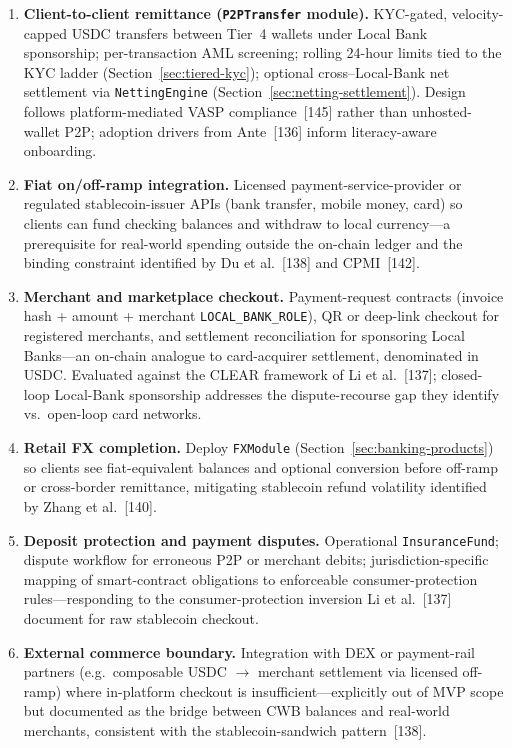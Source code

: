 \documentclass[12pt,a4paper]{report}
\begin{document}
\begin{enumerate}[noitemsep]
\item \textbf{Client-to-client remittance (\texttt{P2PTransfer} module).} KYC-gated, velocity-capped USDC transfers between Tier~4 wallets under Local Bank sponsorship; per-transaction AML screening; rolling 24-hour limits tied to the KYC ladder (Section~\ref{sec:tiered-kyc}); optional cross--Local-Bank net settlement via \texttt{NettingEngine} (Section~\ref{sec:netting-settlement}). Design follows platform-mediated VASP compliance~[145] rather than unhosted-wallet P2P; adoption drivers from Ante~[136] inform literacy-aware onboarding.
\item \textbf{Fiat on/off-ramp integration.} Licensed payment-service-provider or regulated stablecoin-issuer APIs (bank transfer, mobile money, card) so clients can fund checking balances and withdraw to local currency---a prerequisite for real-world spending outside the on-chain ledger and the binding constraint identified by Du et al.~[138] and CPMI~[142].
\item \textbf{Merchant and marketplace checkout.} Payment-request contracts (invoice hash + amount + merchant \texttt{LOCAL\_BANK\_ROLE}), QR or deep-link checkout for registered merchants, and settlement reconciliation for sponsoring Local Banks---an on-chain analogue to card-acquirer settlement, denominated in USDC. Evaluated against the CLEAR framework of Li et al.~[137]; closed-loop Local-Bank sponsorship addresses the dispute-recourse gap they identify vs.\ open-loop card networks.
\item \textbf{Retail FX completion.} Deploy \texttt{FXModule} (Section~\ref{sec:banking-products}) so clients see fiat-equivalent balances and optional conversion before off-ramp or cross-border remittance, mitigating stablecoin refund volatility identified by Zhang et al.~[140].
\item \textbf{Deposit protection and payment disputes.} Operational \texttt{InsuranceFund}; dispute workflow for erroneous P2P or merchant debits; jurisdiction-specific mapping of smart-contract obligations to enforceable consumer-protection rules---responding to the consumer-protection inversion Li et al.~[137] document for raw stablecoin checkout.
\item \textbf{External commerce boundary.} Integration with DEX or payment-rail partners (e.g.\ composable USDC $\to$ merchant settlement via licensed off-ramp) where in-platform checkout is insufficient---explicitly out of MVP scope but documented as the bridge between CWB balances and real-world merchants, consistent with the stablecoin-sandwich pattern~[138].
\end{enumerate}
\end{document}
